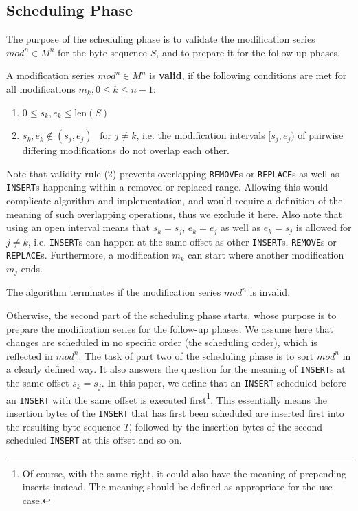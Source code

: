 \documentclass[english, 10pt, openright, twocolumn, landscape, twoside, notitlepage, a4paper, pdftex]		
{article}
\begin{document}
\subsection{Scheduling Phase}%
\label{sec:SchedulingPhase}%

The purpose of the scheduling phase is to validate the modification series $mod^{n}\in M^{n}$ for the byte sequence $S$, and to prepare it for the follow-up phases.

A modification series $mod^{n}\in M^{n}$ is \textbf{valid}, if the following conditions are met for all modifications $m_{k}, 0\leq k\leq n-1$:
\begin{enumerate}
\item $0\leq s_{k},e_{k}\leq \text{len}(S)$
\item $s_{k},e_{k}\notin(s_{j}, e_{j})\ \ \text{ for } j\neq k$, i.e. the modification intervals $[s_{j}, e_{j})$ of pairwise differing modifications do not overlap each other.
\end{enumerate}

Note that validity rule (2) prevents overlapping \texttt{REMOVE}s or \texttt{REPLACE}s as well as \texttt{INSERT}s happening within a removed or replaced range. Allowing this would complicate algorithm and implementation, and would require a definition of the meaning of such overlapping operations, thus we exclude it here. Also note that using an open interval means that $s_{k}=s_{j}$, $e_{k}=e_{j}$ as well as $e_{k}=s_{j}$ is allowed for $j\neq k$, i.e. \texttt{INSERT}s can happen at the same offset as other \texttt{INSERT}s, \texttt{REMOVE}s or \texttt{REPLACE}s. Furthermore, a modification $m_{k}$ can start where another modification $m_{j}$ ends.

The algorithm terminates if the modification series $mod^{n}$ is invalid.

Otherwise, the second part of the scheduling phase starts, whose purpose is to prepare the modification series for the follow-up phases. We assume here that changes are scheduled in no specific order (the scheduling order), which is reflected in $mod^{n}$. The task of part two of the scheduling phase is to sort $mod^{n}$ in a clearly defined way. It also answers the question for the meaning of \texttt{INSERT}s at the same offset $s_{k}=s_{j}$. In this paper, we define that an \texttt{INSERT} scheduled before an \texttt{INSERT} with the same offset is executed first\footnote{Of course, with the same right, it could also have the meaning of prepending inserts instead. The meaning should be defined as appropriate for the use case.}. This essentially means the insertion bytes of the \texttt{INSERT} that has first been scheduled are inserted first into the resulting byte sequence $T$, followed by the insertion bytes of the second scheduled \texttt{INSERT} at this offset and so on.
\end{document}
